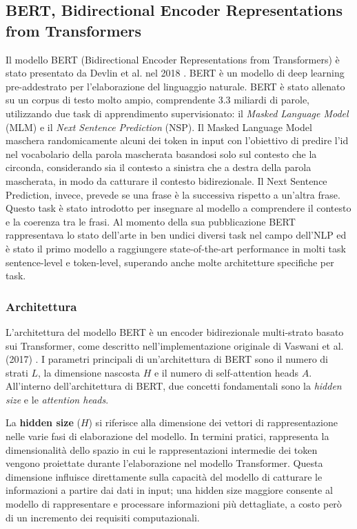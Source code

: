 \documentclass[../../Thesis.tex]{subfiles}
\begin{document}
\subsection{BERT, Bidirectional Encoder Representations from Transformers}
Il modello BERT (Bidirectional Encoder Representations from Transformers) \`e stato presentato da Devlin et al. nel 2018 \cite{BERT}. BERT \`e un modello di deep learning pre-addestrato per l'elaborazione del linguaggio naturale. BERT \`e stato allenato su un corpus di testo molto ampio, comprendente 3.3 miliardi di parole, utilizzando due task di apprendimento supervisionato: il \emph{Masked Language Model} (MLM) e il \emph{Next Sentence Prediction} (NSP). Il Masked Language Model maschera randomicamente alcuni dei token in input con l'obiettivo di predire l'id nel vocabolario della parola mascherata basandosi solo sul contesto che la circonda, considerando sia il contesto a sinistra che a destra della parola mascherata, in modo da catturare il contesto bidirezionale. Il Next Sentence Prediction, invece, prevede se una frase \`e la successiva rispetto a un'altra frase. Questo task \`e stato introdotto per insegnare al modello a comprendere il contesto e la coerenza tra le frasi. Al momento della sua pubblicazione BERT rappresentava lo stato dell'arte in ben undici diversi task nel campo dell'NLP ed \`e stato il primo modello a raggiungere state-of-the-art performance in molti task sentence-level e token-level, superando anche molte architetture specifiche per task. 

\subsubsection{Architettura}
L'architettura del modello BERT \`e un encoder bidirezionale multi-strato basato sui Transformer, come descritto nell'implementazione originale di Vaswani et al. (2017) \cite{AttentionIsAllYouNeed}. I parametri principali di un'architettura di BERT sono il numero di strati $L$, la dimensione nascosta $H$ e il numero di self-attention heads $A$. All'interno dell'architettura di BERT, due concetti fondamentali sono la \textit{hidden size} e le \textit{attention heads}.

La \textbf{hidden size} ($H$) si riferisce alla dimensione dei vettori di rappresentazione nelle varie fasi di elaborazione del modello. In termini pratici, rappresenta la dimensionalit\`a dello spazio in cui le rappresentazioni intermedie dei token vengono proiettate durante l'elaborazione nel modello Transformer. Questa dimensione influisce direttamente sulla capacit\`a del modello di catturare le informazioni a partire dai dati in input; una hidden size maggiore consente al modello di rappresentare e processare informazioni pi\`u dettagliate, a costo per\`o di un incremento dei requisiti computazionali.
\end{document}
